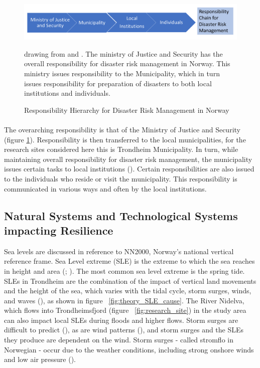 \begin{figure} [h]
    \centering
    \includegraphics[width=1\textwidth]{fig_theory/responsibility drm.png}
    \caption{Responsibility Hierarchy for Disaster Risk Management in Norway}{ drawing from \cite{hanssen_saksframlegg_2013} and \cite{rasanen_conceptualizing_2020}. The ministry of Justice and Security has the overall responsibility for disaster risk management in Norway. This ministry issues responsibility to the Municipality, which in turn issues responsibility for preparation of disasters to both local institutions and individuals. }
    \label{fig:drm_responsibility}
\end{figure}
\paragraph{}
The overarching responsibility is that of the Ministry of Justice and Security (figure \ref{fig:drm_responsibility}). Responsibility is then transferred to the local municipalities, for the research sites considered here this is Trondheim Municipality. In turn, while maintaining overall responsibility for disaster risk management, the municipality issues certain tasks to local institutions (\cite{hanssen_saksframlegg_2013}). Certain responsibilities are also issued to the individuals who reside or visit the municipality. This responsibility is communicated in various ways and often by the local institutions. 





\subsection{Natural Systems and Technological Systems impacting Resilience } \label{theory-nature-tech-resilience}
Sea levels are discussed in reference to NN2000, Norway's national vertical reference frame. Sea Level extreme (SLE) is the extreme to which the sea reaches in height and area (\cite{nilsen_sealevelchangefornorway_2015}; \cite{kartverket_se_2020}). The most common sea level extreme is the spring tide. SLEs in Trondheim are the combination of the impact of vertical land movements and the height of the sea, which varies with the tidal cycle, storm surges, winds, and waves (\cite{hanssen-bauer_climate_2017}), as shown in figure ~\ref{fig:theory_SLE_cause}. The River Nidelva, which flows into Trondheimsfjord (figure ~\ref{fig:research_site}) in the study area can also impact local SLEs during floods and higher flows. Storm surges are difficult to predict (\cite{nilsen_sealevelchangefornorway_2015}), as are wind patterns (\cite{rod_three_2015}), and storm surges and the SLEs they produce are dependent on the wind. Storm surges - called stromflo in Norwegian -  occur due to the weather conditions, including strong onshore winds and low air pressure (\cite{hanssen_saksframlegg_2013}). 


